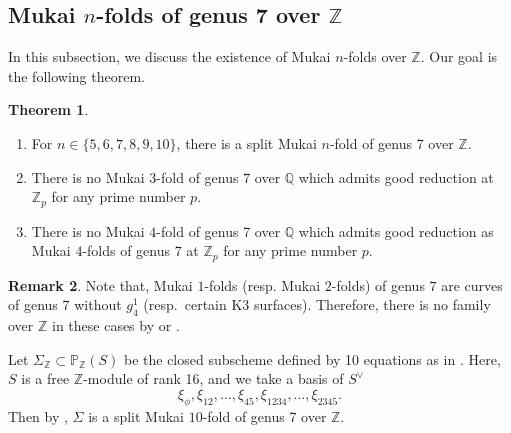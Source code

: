 \documentclass[autodetect-engine, a4paper]{amsart}
\theoremstyle{definition}
\newtheorem{thm}{Theorem}[section]
\newtheorem{rem}[thm]{Remark}
\def\P{{\mathbb P}}
\def\Q{{\mathbb Q}}
\def\Z{{\mathbb Z}}
\begin{document}
\subsection{Mukai $n$-folds of genus 7 over $\Z$}

In this subsection, we discuss the existence of Mukai $n$-folds over $\Z$.
Our goal is the following theorem.

\begin{thm}
\label{thm:MukainoverZ}
\begin{enumerate}
\item 
For $n \in \{5,6,7,8,9,10\}$, there is a split Mukai $n$-fold of genus 7 over $\Z$.
\item 
There is no Mukai $3$-fold of genus $7$ over $\Q$ which admits good reduction at $\Z_{p}$ for any prime number $p$. 

\item 
There is no Mukai $4$-fold of genus 7 over $\Q$ which admits good reduction as Mukai $4$-folds of genus $7$ at $\Z_{p}$ for any prime number $p$.
\end{enumerate}
\end{thm}

\begin{rem}
Note that, Mukai $1$-folds (resp. Mukai $2$-folds) of genus $7$ are
curves of genus $7$ without $g_4^1$ (resp.\ certain K3 surfaces).
Therefore, there is no family over $\Z$ in these cases by \cite[Theorem 1]{Fontaine} or \cite[\S 7.6 Theorem]{Abrashkin}.
\end{rem}

\medskip
{}
Let $\Sigma_{\Z} \subset \P_{\Z} (S)$ be the closed subscheme defined by 10 equations as in \cite[(0.1)]{Mukaicurve}.
Here, $S$ is a free $\Z$-module of rank 16, and we take a basis of $S^{\vee}$
\[
\xi_{\phi}, \xi_{12}, \ldots, \xi_{45}, \xi_{1234}, \ldots, \xi_{2345}.
\]
Then by \cite{Mukaicurve}, $\Sigma$ is a split  Mukai $10$-fold of genus 7 over $\Z$.
\end{document}
